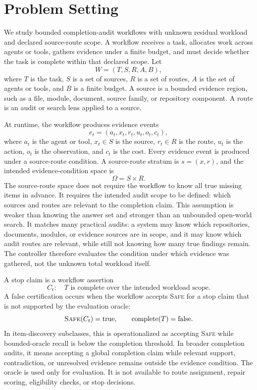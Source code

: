 \documentclass[letterpaper,10pt,twocolumn]{article}
\newcommand{\safe}{\textsc{Safe}}
\newcommand{\OmegaSR}{\Omega}
\begin{document}
\section{Problem Setting}

We study bounded completion-audit workflows with unknown residual workload and
declared source-route scope. A workflow receives a task, allocates work across
agents or tools, gathers evidence under a finite budget, and must decide whether
the task is complete within that declared scope. Let
\[
W=(T,S,R,A,B),
\]
where \(T\) is the task, \(S\) is a set of sources, \(R\) is a set of routes,
\(A\) is the set of agents or tools, and \(B\) is a finite budget. A source is a
bounded evidence region, such as a file, module, document, source family, or
repository component. A route is an audit or search lens applied to a source.

At runtime, the workflow produces evidence events
\[
e_t=(a_t,x_t,r_t,u_t,o_t,c_t),
\]
where \(a_t\) is the agent or tool, \(x_t\in S\) is the source, \(r_t\in R\) is
the route, \(u_t\) is the action, \(o_t\) is the observation, and \(c_t\) is the
cost. Every evidence event is produced under a source-route condition. A
source-route stratum is \(s=(x,r)\), and the intended evidence-condition space is
\[
\OmegaSR=S\times R.
\]
The source-route space does not require the workflow to know all true missing
items in advance. It requires the intended audit scope to be defined: which
sources and routes are relevant to the completion claim.
This assumption is weaker than knowing the answer set and stronger than an
unbounded open-world search. It matches many practical audits: a system may know
which repositories, documents, modules, or evidence sources are in scope, and it
may know which audit routes are relevant, while still not knowing how many true
findings remain. The controller therefore evaluates the condition under which
evidence was gathered, not the unknown total workload itself.

A stop claim is a workflow assertion
\[
C_t:\quad T \text{ is complete over the intended workload scope.}
\]
A false certification occurs when the workflow accepts \safe{} for a stop claim
that is not supported by the evaluation oracle:
\[
\safe(C_t)=\mathrm{true},\qquad \mathrm{complete}(T)=\mathrm{false}.
\]
In item-discovery subclasses, this is operationalized as accepting \safe{} while
bounded-oracle recall is below the completion threshold. In broader completion
audits, it means accepting a global completion claim while relevant support,
contradiction, or unresolved evidence remains outside the evidence condition.
The oracle is used only for evaluation. It is not available to route assignment,
repair scoring, eligibility checks, or stop decisions.
\end{document}
